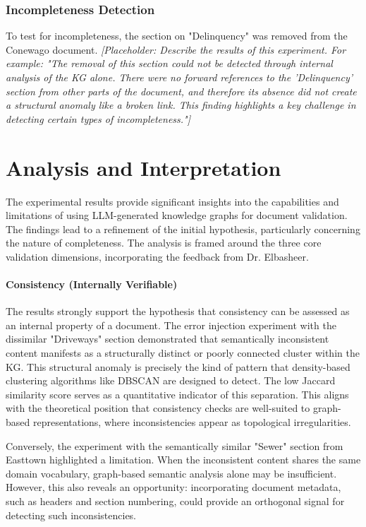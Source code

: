 \subsubsection{Incompleteness Detection}
To test for incompleteness, the section on "Delinquency" was removed from the Conewago document. \textit{[Placeholder: Describe the results of this experiment. For example: "The removal of this section could not be detected through internal analysis of the KG alone. There were no forward references to the 'Delinquency' section from other parts of the document, and therefore its absence did not create a structural anomaly like a broken link. This finding highlights a key challenge in detecting certain types of incompleteness."]}

\section{Analysis and Interpretation}
\label{sec:analysis}
The experimental results provide significant insights into the capabilities and limitations of using LLM-generated knowledge graphs for document validation. The findings lead to a refinement of the initial hypothesis, particularly concerning the nature of completeness. The analysis is framed around the three core validation dimensions, incorporating the feedback from Dr. Elbasheer.

\paragraph{Consistency (Internally Verifiable)}
The results strongly support the hypothesis that consistency can be assessed as an internal property of a document. The error injection experiment with the dissimilar "Driveways" section demonstrated that semantically inconsistent content manifests as a structurally distinct or poorly connected cluster within the KG. This structural anomaly is precisely the kind of pattern that density-based clustering algorithms like DBSCAN are designed to detect. The low Jaccard similarity score serves as a quantitative indicator of this separation. This aligns with the theoretical position that consistency checks are well-suited to graph-based representations, where inconsistencies appear as topological irregularities.

Conversely, the experiment with the semantically similar "Sewer" section from Easttown highlighted a limitation. When the inconsistent content shares the same domain vocabulary, graph-based semantic analysis alone may be insufficient. However, this also reveals an opportunity: incorporating document metadata, such as headers and section numbering, could provide an orthogonal signal for detecting such inconsistencies.

